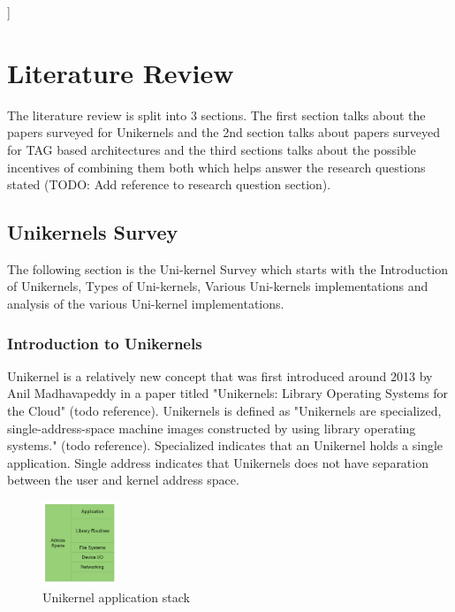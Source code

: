 ]%

\chapter{Literature Review}  %

\ifpdf
    \graphicspath{{LiteratureReview/Figs/Raster/}{LiteratureReview/Figs/PDF/}{LiteratureReview/Figs/}}
\else
    \graphicspath{{LiteratureReview/Figs/}{LiteratureReview/Figs/}}
\fi


The literature review is split into 3 sections. The first section talks about the papers surveyed 
for Unikernels and the 2nd section talks about papers surveyed for TAG based architectures and 
the third sections talks about the possible incentives of combining them both which helps 
answer the research questions stated (TODO: Add reference to research question section). 

\section[Unikernels]{Unikernels Survey}
The following section is the Uni-kernel Survey which starts 
with the Introduction of Unikernels, Types of Uni-kernels, 
Various Uni-kernels implementations and analysis 
of the various Uni-kernel implementations. 

\subsection{Introduction to Unikernels}
Unikernel is a relatively new concept that was first introduced around 2013 by Anil Madhavapeddy in a 
paper titled "Unikernels: Library Operating Systems for the Cloud" (todo reference). Unikernels 
is defined as "Unikernels are specialized, single-address-space machine images constructed by using library 
operating systems." (todo reference). Specialized indicates that an Unikernel holds a single application.
Single address indicates that Unikernels does not have separation between the user and kernel address 
space. 

\begin{figure}[htbp!] 
  \centering    
  \includegraphics[width=0.2\textwidth]{unikernel_application_stack}
  \caption[Unikernel]{Unikernel application stack}
  \label{fig:unikernel_application_stack}
  \end{figure}

